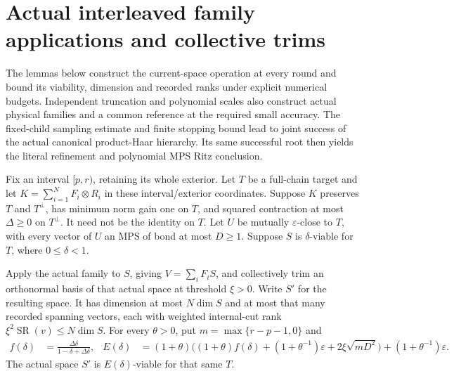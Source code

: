 \section{Actual interleaved family applications and collective trims}

The lemmas below construct the current-space operation at every round and
bound its viability, dimension and recorded ranks under explicit numerical
budgets. Independent truncation and polynomial scales also construct actual
physical families and a common reference at the required small accuracy.
The fixed-child sampling estimate and finite stopping bound lead to joint
success of the actual canonical product-Haar hierarchy. Its same successful
root then yields the literal refinement and polynomial MPS Ritz conclusion.

\begin{lemma}
    \label{lem:interval_family_trim_step}
    \leanok
    Fix an interval $[p,r)$, retaining its whole exterior. Let $T$ be a
    full-chain target and let $K=\sum_{i=1}^N F_i\otimes R_i$ in these
    interval/exterior coordinates. Suppose $K$ preserves $T$ and $T^\perp$,
    has minimum norm gain one on $T$, and squared contraction at most
    $\Delta\ge0$ on $T^\perp$. It need not be the identity on $T$.
    Let $U$ be mutually $\varepsilon$-close to $T$, with every vector of
    $U$ an MPS of bond at most $D\ge1$. Suppose $S$ is $\delta$-viable for
    $T$, where $0\le\delta<1$.

    Apply the actual family to $S$, giving $V=\sum_iF_iS$, and collectively
    trim an orthonormal basis of that actual space at threshold $\xi>0$.
    Write $S'$ for the resulting space. It has dimension at most
    $N\dim S$ and at most that many recorded spanning vectors, each with
    weighted internal-cut rank $\xi^2\operatorname{SR}(v)\le N\dim S$.
    For every $\theta>0$, put $m=\max\{r-p-1,0\}$ and
    \begin{align}
        f(\delta) & =\frac{\Delta\delta}{1-\delta+\Delta\delta}, &
        E(\delta) & =(1+\theta)\bigl((1+\theta)f(\delta)
        +(1+\theta^{-1})\varepsilon+2\xi\sqrt{mD^2}\bigr)
        +(1+\theta^{-1})\varepsilon.
        \label{eq:interval_family_trim_error}
    \end{align}
    The actual space $S'$ is $E(\delta)$-viable for that same $T$.
\end{lemma}
